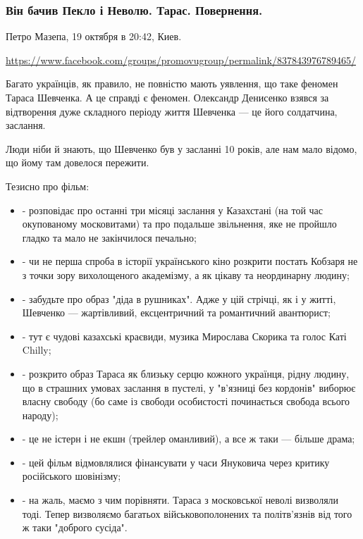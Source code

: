  
 

\subsubsection{Він бачив Пекло і Неволю. Тарас. Повернення.}
\label{sec:19_10_2020.fb.petro_mazepa.1.taras_povernennja}

Петро Мазепа, 19 октября в 20:42, Киев.

\url{https://www.facebook.com/groups/promovugroup/permalink/837843976789465/}

Багато українців, як правило, не повністю мають уявлення, що таке феномен
Тараса Шевченка. А це справді є феномен. Олександр Денисенко взявся за
відтворення дуже складного періоду життя Шевченка --- це його солдатчина,
заслання.

Люди ніби й знають, що Шевченко був у засланні 10 років, але нам мало відомо,
що йому там довелося пережити.

Тезисно про фільм:

\begin{itemize}
\item - розповідає про останні три місяці заслання у Казахстані (на той час окупованому московитами) та про подальше звільнення, яке не пройшло гладко та мало не закінчилося печально;

\item - чи не перша спроба в історії українського кіно розкрити постать Кобзаря не з точки зору вихолощеного академізму, а як цікаву та неординарну людину;

\item - забудьте про образ "діда в рушниках". Адже у цій стрічці, як і у житті, Шевченко --- жартівливий, ексцентричний та романтичний авантюрист;

\item - тут є чудові казахські краєвиди, музика Мирослава Скорика та голос Каті Chilly;
\item - розкрито образ Тараса як близьку серцю кожного українця, рідну людину, що в
страшних умовах заслання в пустелі, у "в'язниці без кордонів" виборює власну
свободу (бо саме із свободи особистості починається свобода всього народу);

\item - це не істерн і не екшн (трейлер оманливий), а все ж таки --- більше драма;
\item - цей фільм відмовлялися фінансувати у часи Януковича через критику російського шовінізму;
\item - на жаль, маємо з чим порівняти. Тараса з московської неволі визволяли
				тоді.  Тепер визволяємо багатьох військовополонених та політв'язнів від
								того ж таки "доброго сусіда".
\end{itemize}


